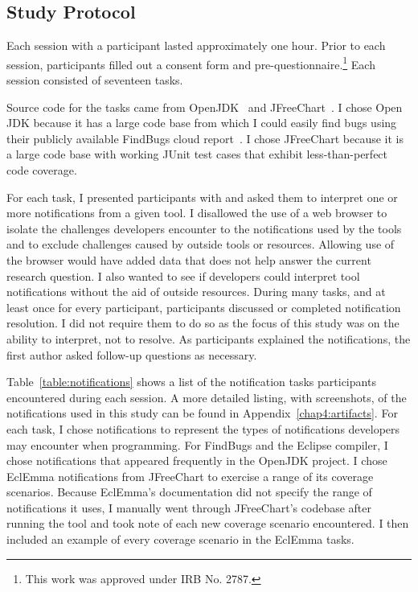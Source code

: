 \subsection{Study Protocol}

Each session with a participant lasted approximately one hour.
Prior to each session, participants filled out a consent form
and pre-questionnaire.\footnote{This work was approved under IRB No. 2787.} 
Each session consisted of seventeen tasks.

Source code for the tasks came from OpenJDK~\cite{OpenJDK} and JFreeChart~\cite{JFreeChart}.
I chose Open JDK because it has a large code base from which I could easily
find bugs using their publicly available FindBugs cloud
report~\cite{FindBugsCloud}. I chose JFreeChart because it is a large code
base with working JUnit test cases that exhibit less-than-perfect code coverage.

For each task, I presented participants with and asked them to interpret one or more notifications from a given tool.
I disallowed the use of a web browser to isolate the challenges developers encounter to the notifications used by the tools and to exclude challenges caused by outside tools or resources.
Allowing use of the browser would have added data that does not help answer the current research question.
I also wanted to see if developers could interpret tool notifications without the aid of outside resources. 
During many tasks, and at least once for every participant, participants
discussed or completed notification resolution. I did not require them to do so as the focus of this study was on the ability to interpret, not to resolve.
As participants explained the notifications, the first author asked follow-up
questions as necessary. 

Table~\ref{table:notifications} shows a list of the notification tasks participants encountered during each session. A more detailed listing, with screenshots, of the notifications used in this study can be found in Appendix~\ref{chap4:artifacts}. 
For each task, I chose notifications to represent the types of notifications developers may encounter when programming.
For FindBugs and the Eclipse compiler, I chose notifications that appeared frequently in the OpenJDK project. 
I chose EclEmma notifications from JFreeChart to exercise a range of its coverage scenarios. 
Because EclEmma's documentation did not specify the range of notifications it uses, 
I manually went through JFreeChart's codebase after running the tool and took note of 
each new coverage scenario encountered.
I then included an example of every coverage scenario in the EclEmma tasks.


